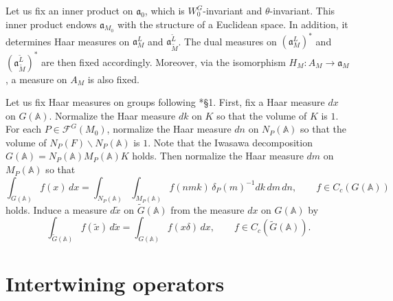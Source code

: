 \documentclass[12pt]{amsart}
\theoremstyle{definition}
\theoremstyle{plain}
\theoremstyle{remark}
\def\A{\mathbb{A}}%
\def\bs{\backslash}%
\newcommand{\fa}{\mathfrak{a}}
\newcommand{\cF}{\mathcal{F}}
\numberwithin{equation}{section}
\newcommand{\tG}{\widetilde{G}}
\newcommand{\tM}{\widetilde{M}}
\newcommand{\tL}{\widetilde{L}}
\begin{document}
Let us fix an inner product on $\fa_0$, which is $W_0^G$-invariant and $\theta$-invariant.
This inner product endows $\fa_{M_0}$ with the structure of a Euclidean space. 
In addition, it determines Haar measures on $\fa_{M}^L$ and $\fa_{\tM}^{\tL}$.
The dual measures on $(\fa_{M}^{L})^*$ and $(\fa_{\tM}^{\tL})^*$ are then fixed accordingly.
Moreover, via the isomorphism $H_M\colon A_M\to \fa_M$, a measure on $A_M$ is also fixed.


Let us fix Haar measures on groups following \cite{Art78}*{\S1}. 
First, fix a Haar measure $dx$ on $G(\A)$. 
Normalize the Haar measure $dk$ on $K$ so that the volume of $K$ is $1$. 
For each $P\in\cF^G(M_0)$, normalize the Haar measure $dn$ on $N_P(\A)$ so that the volume of $N_P(F)\bs N_P(\A)$ is $1$. 
Note that the Iwasawa decomposition $G(\A)=N_P(\A) M_P(\A)K$ holds. 
Then normalize the Haar measure $dm$ on $M_P(\A)$ so that
\[
\int_{G(\A)} f(x)\, dx =\int_{N_P(\A)} \int_{M_P(\A)} f(nmk) \, \delta_P(m)^{-1}  dk\, dm \, dn, \qquad  f\in C_c(G(\A)) 
\]
holds.
Induce a measure $d\widetilde{x}$ on $\tG(\A)$ from the measure $dx$ on $G(\A)$ by
\[
\int_{\tG(\A)}f(\widetilde{x})\, d\widetilde{x}=\int_{G(\A)} f(x\delta) \, dx,\qquad f\in C_c(\tG(\A)).
\]



\section{Intertwining operators}\label{sec:intertwining}
\end{document}
